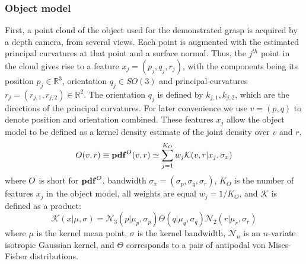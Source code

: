 \subsubsection{Object model}
First, a point cloud of the object used for the demonstrated grasp is acquired by a depth camera, from several views. Each point is augmented with the estimated principal curvatures at that point and a surface normal. Thus, the $j^{th}$ point  in the cloud gives rise to a feature $x_j=(p_j, q_j, r_j)$, with the components being its position $p_j \in \mathbb R^3$, orientation $q_j \in SO(3)$ and principal curvatures $r_j=(r_{j,1},r_{j,2}) \in \mathbb R^2$. The orientation $q_j$ is defined by $k_{j,1},k_{j,2}$, which are the directions of the principal curvatures.  For later convenience we use $v=(p,q)$ to denote position and orientation combined. These features $x_j$ allow the object model to be defined as a kernel density estimate of the joint density over $v$ and $r$.
\begin{equation}
\om(v, r) \equiv \pdf^\om(v, r) \simeq \sum_{j=1}^{K_O} w_j \mathcal{K}(v, r|{x_j}, \sigma_{x})
\label{eq:om}
\end{equation}
where $O$ is short for $\mathbf{pdf}^O$, bandwidth $\sigma_{x} = (\sigma_{p}, \sigma _{q}, \sigma_{r})$, $K_O$ is the number of features $x_j$ in the object model, all weights are equal $w_j = 1/{K_O}$, and $\mathcal{K}$ is defined as a product:
\begin{equation}\label{eq:kernel_in_se3}
\mathcal{K}(x | \mu, \sigma) = \mathcal{N}_3(p| \mu_p, \sigma_p) \Theta(q| \mu_q, \sigma_q) \mathcal{N}_2(r| \mu_r, \sigma_r)
\end{equation}
where $\mu$ is the kernel mean point, $\sigma$ is the kernel bandwidth, $\mathcal{N}_n$ is an $n$-variate isotropic Gaussian kernel, and ${\Theta}$ corresponds to a pair of antipodal von Mises-Fisher distributions.
